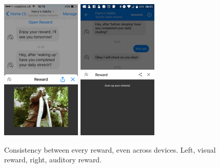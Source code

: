 \begin{figure}[H]
  \centering
  \includegraphics[width=1.5in]{../resources/design/reward-visual-2.png}
  \hspace{10px}
  \includegraphics[width=1.5in]{../resources/design/reward-audio.png}
  \caption{Consistency between every reward, even across devices. Left, visual reward, right, auditory reward.}
  \label{fig:rewards_consistency}
\end{figure}


